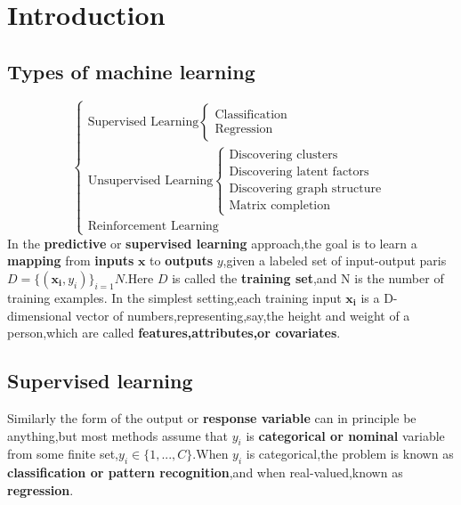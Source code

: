 \chapter{Introduction}

\section{Types of machine learning}
\begin{equation}\nonumber
\begin{cases}
\text{Supervised Learning} \begin{cases} \text{Classification} \\ \text{Regression} \end{cases}\\
\text{Unsupervised Learning} \begin{cases} \text{Discovering clusters} \\ \text{Discovering latent factors} \\ \text{Discovering graph structure} \\ \text{Matrix completion} \end{cases}\\
\text{Reinforcement Learning}
\end{cases}
\end{equation}
In the \textbf{predictive} or \textbf{supervised learning} approach,the goal is to learn a \textbf{mapping} from \textbf{inputs} $\mathbf{x}$ to \textbf{outputs} $y$,given a labeled set of input-output paris $D=\{(\mathbf{x_i},y_i)\}_{i=1}{N}$.Here $D$ is called the \textbf{training set},and N is the number of training examples.
In the simplest setting,each training input $\mathbf{x_i}$ is a D-dimensional vector of numbers,representing,say,the height and weight of a person,which are called \textbf{features,attributes,or covariates}.

\section{Supervised learning}
  Similarly the form of the output or \textbf{response variable} can in principle be anything,but most methods assume that $y_i$ is \textbf{categorical or nominal} variable from some finite set,$y_i \in \{1,...,C\}$.When $y_i$ is categorical,the problem is known as \textbf{classification or pattern recognition},and when real-valued,known as \textbf{regression}.
